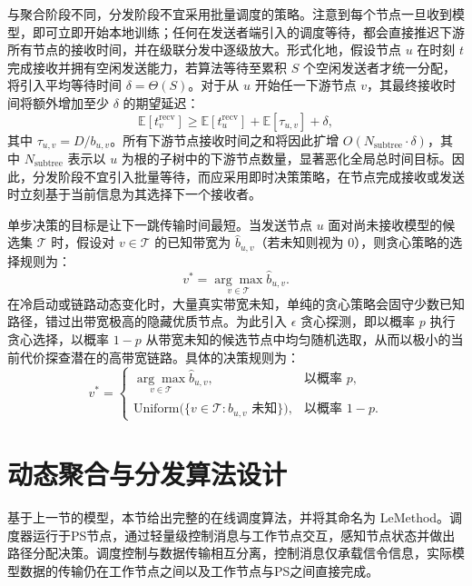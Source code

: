 \documentclass[master, vlined]{DissertUESTC}
\begin{document}
	与聚合阶段不同，分发阶段不宜采用批量调度的策略。注意到每个节点一旦收到模型，即可立即开始本地训练；任何在发送者端引入的调度等待，都会直接推迟下游所有节点的接收时间，并在级联分发中逐级放大。形式化地，假设节点 $u$ 在时刻 $t$ 完成接收并拥有空闲发送能力，若算法等待至累积 $S$ 个空闲发送者才统一分配，将引入平均等待时间 $\delta = \Theta(S)$。对于从 $u$ 开始任一下游节点 $v$，其最终接收时间将额外增加至少 $\delta$ 的期望延迟：
	\begin{equation}
		\mathbb{E}[t_v^{\text{recv}}] \ge \mathbb{E}[t_u^{\text{recv}}] + \mathbb{E}[\tau_{u,v}] + \delta,
		\label{eq:dist-wait-delay}
	\end{equation}
	其中 $\tau_{u,v}=D/b_{u,v}$。所有下游节点接收时间之和将因此扩增 $O(N_{\text{subtree}}\cdot \delta)$，其中 $N_{\text{subtree}}$ 表示以 $u$ 为根的子树中的下游节点数量，显著恶化全局总时间目标。因此，分发阶段不宜引入批量等待，而应采用即时决策策略，在节点完成接收或发送时立刻基于当前信息为其选择下一个接收者。

	单步决策的目标是让下一跳传输时间最短。当发送节点 $u$ 面对尚未接收模型的候选集 $\mathcal{T}$ 时，假设对 $v\in\mathcal{T}$ 的已知带宽为 $\hat{b}_{u,v}$（若未知则视为 $0$），则贪心策略的选择规则为：
	\begin{equation}
		v^* = \underset{v\in\mathcal{T}}{\arg\max} \hat{b}_{u,v}.
		\label{eq:dist-greedy}
	\end{equation}
	在冷启动或链路动态变化时，大量真实带宽未知，单纯的贪心策略会固守少数已知路径，错过出带宽极高的隐藏优质节点。为此引入 $\epsilon$ 贪心探测，即以概率 $p$ 执行贪心选择，以概率 $1-p$ 从带宽未知的候选节点中均匀随机选取，从而以极小的当前代价探查潜在的高带宽链路。具体的决策规则为：
	\begin{equation}
		v^* = \begin{cases}
		\displaystyle\underset{v\in\mathcal{T}}{\arg\max} \hat{b}_{u,v}, & \text{以概率 } p,\\[6pt]
		\text{Uniform}\bigl(\{v\in\mathcal{T}:\hat{b}_{u,v}\text{ 未知}\}\bigr), & \text{以概率 } 1-p.
		\end{cases}
		\label{eq:dist-epsilon-greedy}
	\end{equation}

	\section{动态聚合与分发算法设计}
	\label{sec:scheduling-design}

	基于上一节的模型，本节给出完整的在线调度算法，并将其命名为 LeMethod。调度器运行于PS节点，通过轻量级控制消息与工作节点交互，感知节点状态并做出路径分配决策。调度控制与数据传输相互分离，控制消息仅承载信令信息，实际模型数据的传输仍在工作节点之间以及工作节点与PS之间直接完成。
\end{document}
